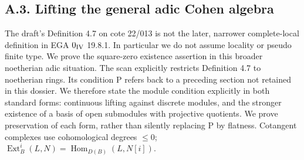 \subsection{A.3. Lifting the general adic Cohen algebra}
\label{subsec:A3}

The draft's Definition 4.7 on cote 22/013 is not the later, narrower
complete-local definition in EGA $0_{\rm IV}$ 19.8.1. In particular we
do not assume locality or pseudo finite type. We prove the square-zero
existence assertion in this broader noetherian adic situation.
The scan explicitly restricts Definition 4.7 to noetherian rings.
Its condition P refers back to a preceding section not retained in
this dossier. We therefore state the module condition explicitly in
both standard forms: continuous lifting against discrete modules,
and the stronger existence of a basis of open submodules with
projective quotients. We prove preservation of each form, rather
than silently replacing P by flatness.
Cotangent complexes use cohomological degrees $\leq0$;
$\operatorname{Ext}^i_B(L,N)=\operatorname{Hom}_{D(B)}(L,N[i])$.

